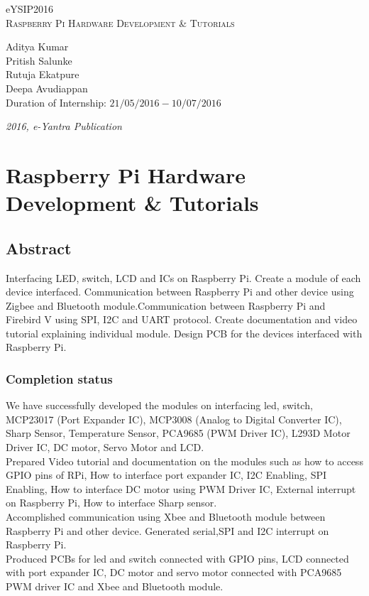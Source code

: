 \documentclass[a4paper,12pt,oneside]{book}
\begin{document}
\begin{titlepage}
\raggedright
{\Large eYSIP2016\\[1cm]}
{\Huge\scshape Raspberry Pi Hardware Development \& Tutorials \\[.1in]}
\vfill
\begin{flushright}
{\large Aditya Kumar \\}
{\large Pritish Salunke \\}
{\large Rutuja Ekatpure \\}
{\large Deepa Avudiappan \\}
{\large Duration of Internship: $ 21/05/2016-10/07/2016 $ \\}
\end{flushright}

{\itshape 2016, e-Yantra Publication}
\end{titlepage}

\chapter[Project Tag]{Raspberry Pi Hardware Development \& Tutorials}
\section*{Abstract}
Interfacing LED, switch, LCD and ICs on Raspberry Pi. Create a module of each device interfaced. Communication between Raspberry Pi and other device using Zigbee and Bluetooth module.Communication between Raspberry Pi and Firebird V using SPI, I2C and UART protocol. Create documentation and video tutorial explaining individual module. Design PCB for the devices interfaced with Raspberry Pi.

\subsection*{Completion status}
We have successfully developed the modules on interfacing led, switch, MCP23017 (Port Expander IC), MCP3008 (Analog to Digital Converter IC), Sharp Sensor, Temperature Sensor, PCA9685 (PWM Driver IC), L293D Motor Driver IC, DC motor, Servo Motor and LCD.\\
Prepared Video tutorial and documentation on the modules such as how to access GPIO pins of RPi, How to interface port expander IC, I2C Enabling, SPI Enabling, How to interface DC motor using PWM Driver IC, External interrupt on Raspberry Pi, How to interface Sharp sensor.\\
Accomplished communication using Xbee and Bluetooth module between Raspberry Pi and other device. Generated serial,SPI and I2C interrupt on Raspberry Pi. \\
Produced PCBs for led and switch connected with GPIO pins, LCD connected with port expander IC, DC motor and servo motor connected with PCA9685 PWM driver IC and Xbee and Bluetooth module.
\end{document}
